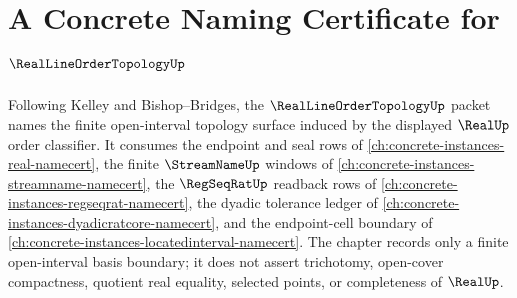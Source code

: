 \chapter{A Concrete Naming Certificate for $\RealLineOrderTopologyUp$}
\label{ch:concrete-instances-real-line-order-topology-namecert}

Following Kelley and Bishop--Bridges, the $\RealLineOrderTopologyUp$ packet names the finite open-interval topology surface induced by the displayed $\RealUp$ order classifier. It consumes the endpoint and seal rows of \autoref{ch:concrete-instances-real-namecert}, the finite $\StreamNameUp$ windows of \autoref{ch:concrete-instances-streamname-namecert}, the $\RegSeqRatUp$ readback rows of \autoref{ch:concrete-instances-regseqrat-namecert}, the dyadic tolerance ledger of \autoref{ch:concrete-instances-dyadicratcore-namecert}, and the endpoint-cell boundary of \autoref{ch:concrete-instances-locatedinterval-namecert}. The chapter records only a finite open-interval basis boundary; it does not assert trichotomy, open-cover compactness, quotient real equality, selected points, or completeness of $\RealUp$.

